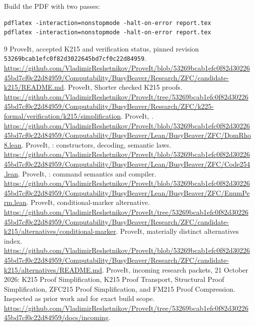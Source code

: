 \documentclass[11pt]{article}
\newcommand{\code}[1]{\texttt{\detokenize{#1}}}
\newcommand{\pin}{\texttt{53269bcab1efc0f82d3022645bd7cf0c22d84959}}
\begin{document}
Build the PDF with two passes:
\begin{lstlisting}
pdflatex -interaction=nonstopmode -halt-on-error report.tex
pdflatex -interaction=nonstopmode -halt-on-error report.tex
\end{lstlisting}

\begin{thebibliography}{9}
 ProveIt, accepted K215 and verification status, pinned revision \pin. \url{https://github.com/VladimirReshetnikov/ProveIt/blob/53269bcab1efc0f82d3022645bd7cf0c22d84959/Computability/BusyBeaver/Research/ZFC/candidate-k215/README.md}.
 ProveIt, Shorter checked K215 proofs. \url{https://github.com/VladimirReshetnikov/ProveIt/tree/53269bcab1efc0f82d3022645bd7cf0c22d84959/Computability/BusyBeaver/Research/ZFC/k225-formal/verification/k215/simplification}.
 ProveIt, \code{DomRho8.lean}. \url{https://github.com/VladimirReshetnikov/ProveIt/blob/53269bcab1efc0f82d3022645bd7cf0c22d84959/Computability/BusyBeaver/Lean/BusyBeaver/ZFC/DomRho8.lean}.
 ProveIt, \code{Code254.lean}: constructors, decoding, semantic laws. \url{https://github.com/VladimirReshetnikov/ProveIt/blob/53269bcab1efc0f82d3022645bd7cf0c22d84959/Computability/BusyBeaver/Lean/BusyBeaver/ZFC/Code254.lean}.
 ProveIt, \code{EnumPerm.lean}: command semantics and compiler. \url{https://github.com/VladimirReshetnikov/ProveIt/blob/53269bcab1efc0f82d3022645bd7cf0c22d84959/Computability/BusyBeaver/Lean/BusyBeaver/ZFC/EnumPerm.lean}.
 ProveIt, conditional-marker alternative. \url{https://github.com/VladimirReshetnikov/ProveIt/tree/53269bcab1efc0f82d3022645bd7cf0c22d84959/Computability/BusyBeaver/Research/ZFC/candidate-k215/alternatives/conditional-marker}.
 ProveIt, materially distinct alternatives index. \url{https://github.com/VladimirReshetnikov/ProveIt/blob/53269bcab1efc0f82d3022645bd7cf0c22d84959/Computability/BusyBeaver/Research/ZFC/candidate-k215/alternatives/README.md}.
 ProveIt, incoming research packets, 21 October 2026: K215 Proof Simplification, K215 Proof Transport, Structural Proof Simplification, ZFC215 Proof Simplification, and FM215 Proof Compression. Inspected as prior work and for exact build scope. \url{https://github.com/VladimirReshetnikov/ProveIt/tree/53269bcab1efc0f82d3022645bd7cf0c22d84959/docs/incoming}.
\end{thebibliography}
\end{document}
